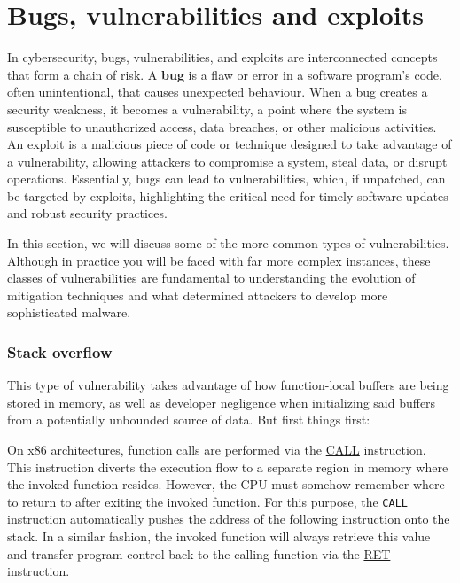 \section{Bugs, vulnerabilities and exploits}

In cybersecurity, bugs, vulnerabilities, and exploits are interconnected
concepts that form a chain of risk. A \textbf{bug} is a flaw or error in a
software program's code, often unintentional, that causes unexpected behaviour.
When a bug creates a security weakness, it becomes a vulnerability, a point
where the system is susceptible to unauthorized access, data breaches, or other
malicious activities. An exploit is a malicious piece of code or technique
designed to take advantage of a vulnerability, allowing attackers to compromise
a system, steal data, or disrupt operations. Essentially, bugs can lead to
vulnerabilities, which, if unpatched, can be targeted by exploits, highlighting
the critical need for timely software updates and robust security practices.

In this section, we will discuss some of the more common types of
vulnerabilities. Although in practice you will be faced with far more complex
instances, these classes of vulnerabilities are fundamental to understanding
the evolution of mitigation techniques and what determined attackers to develop
more sophisticated malware.

\subsubsection{Stack overflow}

This type of vulnerability takes advantage of how function-local buffers are
being stored in memory, as well as developer negligence when initializing said
buffers from a potentially unbounded source of data. But first things first:

On x86 architectures, function calls are performed via the
\href{https://www.felixcloutier.com/x86/call}{CALL} instruction. This instruction
diverts the execution flow to a separate region in memory where the invoked
function resides. However, the CPU must somehow remember where to return to
after exiting the invoked function. For this purpose, the \texttt{CALL}
instruction automatically pushes the address of the following instruction
onto the stack. In a similar fashion, the invoked function will always retrieve
this value and transfer program control back to the calling function via the
\href{https://www.felixcloutier.com/x86/ret}{RET} instruction.

